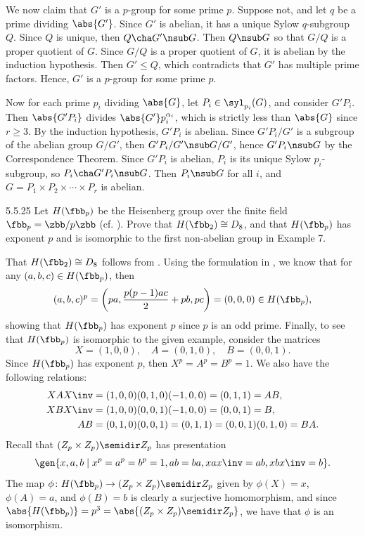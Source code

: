 \begin{soliff}
    We now claim that $G'$ is a $p$-group for some prime $p$.
    Suppose not, and let $q$ be a prime dividing $\abs{G'}$.
    Since $G'$ is abelian, it has a unique Sylow $q$-subgroup $Q$.
    Since $Q$ is unique, then $Q \cha G' \nsub G$.
    Then $Q \nsub G$ so that $G/Q$ is a proper quotient of $G$.
    Since $G/Q$ is a proper quotient of $G$, it is abelian by the induction hypothesis.
    Then $G' \leq Q$, which contradicts that $G'$ has multiple prime factors.
    Hence, $G'$ is a $p$-group for some prime $p$.

    Now for each prime $p_i$ dividing $\abs{G}$, let $P_i \in \syl_{p_i}(G)$, and consider $G'P_i$.
    Then $\abs{G'P_i}$ divides $\abs{G'}p_i^{\alpha_i}$, which is strictly less than $\abs{G}$ since $r \geq 3$.
    By the induction hypothesis, $G'P_i$ is abelian.
    Since $G'P_i/G'$ is a subgroup of the abelian group $G/G'$, then $G'P_i/G' \nsub G/G'$, hence $G'P_i \nsub G$ by the Correspondence Theorem.
    Since $G'P_i$ is abelian, $P_i$ is its unique Sylow $p_i$-subgroup, so $P_i \cha G'P_i \nsub G$.
    Then $P_i \nsub G$ for all $i$, and $G = P_1 \times P_2 \times \cdots \times P_r$ is abelian.
\end{soliff}

\begin{exercise}{5.5.25}
    Let $H(\fbb_p)$ be the Heisenberg group over the finite field $\fbb_p = \zbb/p\zbb$ (cf. ).
	Prove that $H(\fbb_2) \cong D_8$, and that $H(\fbb_p)$ has exponent $p$ and is isomorphic to the first non-abelian group in Example 7.
\end{exercise}

\begin{sol}
    That $H(\fbb_2) \cong D_8$ follows from .
    Using the formulation in , we know that for any $(a, b, c) \in H(\fbb_p)$, then
    \[
        (a, b, c)^p = \left(pa, \frac{p(p - 1)ac}{2} + pb, pc\right) = (0, 0, 0) \in H(\fbb_p),
    \]
    showing that $H(\fbb_p)$ has exponent $p$ since $p$ is an odd prime. Finally, to see that $H(\fbb_p)$ is isomorphic to the given example, consider the matrices
    \[
        X = (1, 0, 0), \quad A = (0, 1, 0), \quad B = (0, 0, 1).
    \]
    Since $H(\fbb_p)$ has exponent $p$, then $X^p = A^p = B^p = 1$.
    We also have the following relations:
    \begin{align*}
        X A X\inv &= (1, 0, 0)(0, 1, 0)(-1, 0, 0) = (0, 1, 1) = AB, \\
        X B X\inv &= (1, 0, 0)(0, 0, 1)(-1, 0, 0) = (0, 0, 1) = B, \\
        AB &= (0, 1, 0)(0, 0, 1) = (0, 1, 1) = (0, 0, 1)(0, 1, 0) = BA.
    \end{align*}
    Recall that $(Z_p \times Z_p) \semidir Z_p$ has presentation
    \[
        \gen{x, a, b \mid x^p = a^p = b^p = 1, ab = ba, xax\inv = ab, xbx\inv = b}.
    \]
    The map $\phi \colon H(\fbb_p) \to (Z_p \times Z_p) \semidir Z_p$ given by $\phi(X) = x$, $\phi(A) = a$, and $\phi(B) = b$ is clearly a surjective homomorphism, and since $\abs{H(\fbb_p)} = p^3 = \abs{(Z_p \times Z_p) \semidir Z_p}$, we have that $\phi$ is an isomorphism.
\end{sol}
